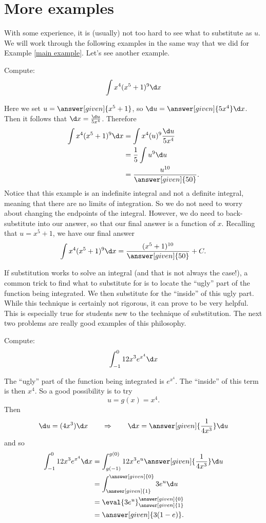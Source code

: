\documentclass{ximera}
\begin{document}
\section{More examples}

With some experience, it is (usually) not too hard to see what to
substitute as $u$.  We will work through the following examples in the
same way that we did for Example \ref{main example}. Let's see another
example.

\begin{example}
Compute:
\[
\int x^4(x^5+1)^{9} \d x
\]
\begin{explanation}
Here we set $u =  \answer[given]{x^5+1}$, so $\d u =  \answer[given]{5x^4} \d x$.  Then
it follows that $\d x=\frac{\d u}{5x^4}$. Therefore
\begin{align*}
  \int x^4(x^5+1)^{9} \d x &= \int x^4 (u)^{9} \frac{\d u}{5x^4} \\
  &= \frac{1}{5} \int u^{9} \d u\\
&=\frac{u^{10}}{ \answer[given]{50}}.
\end{align*}
Notice that this example is an indefinite integral and not a definite
integral, meaning that there are no limits of integration.  So we do
not need to worry about changing the endpoints of the integral.  However,
we do need to back-substitute into our answer, so that our final
answer is a function of $x$.  Recalling that $u= x^5+1$, we have
our final answer
\[
\int x^4(x^5+1)^{9} \d x= \frac{(x^5+1)^{10}}{\answer[given]{50}}+C.
\]
\end{explanation}
\end{example}


If substitution works to solve an integral (and that is not always the
case!), a common trick to find what to substitute for is to locate the
``ugly'' part of the function being integrated.  We then substitute
for the ``inside'' of this ugly part.  While this technique is
certainly not rigorous, it can prove to be very helpful.  This is
especially true for students new to the technique of substitution.
The next two problems are really good examples of this philosophy.

\begin{example}
Compute:
\[
\int_{-1}^0 12x^3 e^{x^4} \d x
\]
\begin{explanation}
The ``ugly'' part of the function being integrated is $e^{x^4}$.  The
``inside'' of this term is then $x^4$.  So a good possibility is to
try
\[
u =g(x)= x^4.
\]
Then
\[
\d u = (4x^3) \d x 	\qquad	\Rightarrow	\qquad	\d x = \answer[given]{\frac{1}{4x^3}} \d u
\]
and so
\begin{align*}
\int_{-1}^0 12x^3 e^{x^4} \d x &= \int_{g(-1)}^{g(0)} 12 x^3 e^u \answer[given]{\frac{1}{4x^3}} \d u  \\
&= \int_{\answer[given]{1}}^{\answer[given]{0}} 3 e^u \d u  \\
&= \eval{3e^u}_{\answer[given]{1}}^{\answer[given]{0}}  \\
&= \answer[given]{3(1-e)}.
\end{align*}
\end{explanation}
\end{example}
\end{document}
